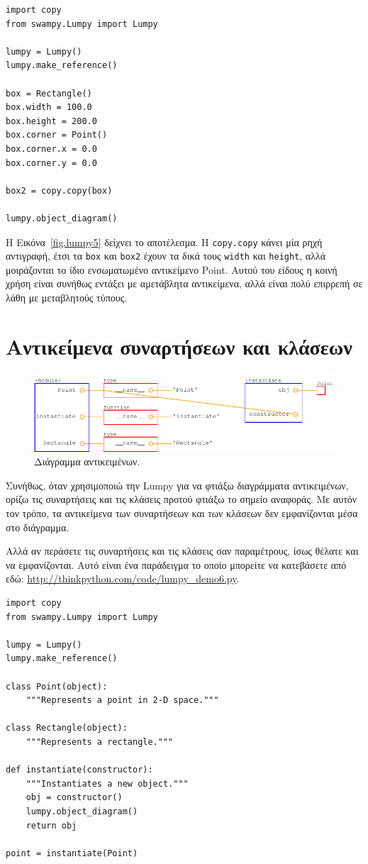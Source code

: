 \documentclass[10pt]{book}
\begin{document}
\begin{verbatim}
import copy
from swampy.Lumpy import Lumpy

lumpy = Lumpy()
lumpy.make_reference()

box = Rectangle()
box.width = 100.0
box.height = 200.0
box.corner = Point()
box.corner.x = 0.0
box.corner.y = 0.0

box2 = copy.copy(box)

lumpy.object_diagram()
\end{verbatim}

Η Εικόνα~\ref{fig.lumpy5} δείχνει το αποτέλεσμα.  Η {\tt copy.copy} κάνει μία ρηχή αντιγραφή, έτσι τα
{\tt box} και {\tt box2} έχουν τα δικά τους {\tt width} και {\tt height}, αλλά μοιράζονται το ίδιο
ενσωματωμένο αντικείμενο Point.  Αυτού του είδους η κοινή χρήση είναι συνήθως εντάξει με αμετάβλητα
αντικείμενα, αλλά είναι πολύ επιρρεπή σε λάθη με μεταβλητούς τύπους.

\section{Αντικείμενα συναρτήσεων και κλάσεων}

\begin{figure}
\centerline
{\includegraphics[scale=0.7]{figs/lumpydemo6.pdf}}
\caption{Διάγραμμα αντικειμένων.}
\label{fig.lumpy6}
\end{figure}

Συνήθως, όταν χρησιμοποιώ την Lumpy για να φτιάξω διαγράμματα αντικειμένων, ορίζω τις συναρτήσεις και τις
κλάσεις προτού φτιάξω το σημείο αναφοράς.  Με αυτόν τον τρόπο, τα αντικείμενα των συναρτήσεων και των
κλάσεων δεν εμφανίζονται μέσα στο διάγραμμα.

Αλλά αν περάσετε τις συναρτήσεις και τις κλάσεις σαν παραμέτρους, ίσως θέλατε και να εμφανίζονται.  Αυτό
είναι ένα παράδειγμα το οποίο μπορείτε να κατεβάσετε από εδώ: \url{http://thinkpython.com/code/lumpy_demo6.py}. 

\begin{verbatim}
import copy
from swampy.Lumpy import Lumpy

lumpy = Lumpy()
lumpy.make_reference()

class Point(object):
    """Represents a point in 2-D space."""

class Rectangle(object):
    """Represents a rectangle."""

def instantiate(constructor):
    """Instantiates a new object."""
    obj = constructor()
    lumpy.object_diagram()
    return obj

point = instantiate(Point)
\end{verbatim}
\end{document}
